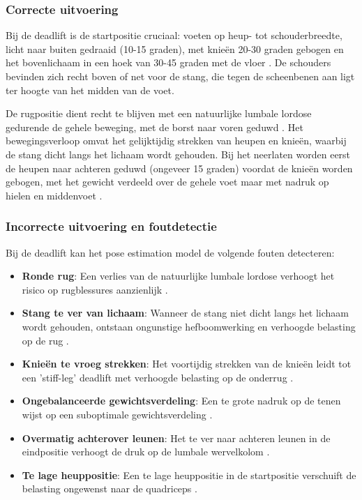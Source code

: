 \subsubsection{Correcte uitvoering}
Bij de deadlift is de startpositie cruciaal: voeten op heup- tot schouderbreedte, licht naar buiten gedraaid (10-15 graden), met knieën 20-30 graden gebogen en het bovenlichaam in een hoek van 30-45 graden met de vloer \autocite{BirdEtAl2010}. 
De schouders bevinden zich recht boven of net voor de stang, die tegen de scheenbenen aan ligt ter hoogte van het midden van de voet.

De rugpositie dient recht te blijven met een natuurlijke lumbale lordose gedurende de gehele beweging, met de borst naar voren geduwd \autocite{Ronai2020}. 
Het bewegingsverloop omvat het gelijktijdig strekken van heupen en knieën, waarbij de stang dicht langs het lichaam wordt gehouden. 
Bij het neerlaten worden eerst de heupen naar achteren geduwd (ongeveer 15 graden) voordat de knieën worden gebogen, met het gewicht verdeeld over de gehele voet maar met nadruk op hielen en middenvoet \autocite{Ronai2020}.

\subsubsection{Incorrecte uitvoering en foutdetectie}
Bij de deadlift kan het pose estimation model de volgende fouten detecteren:

\begin{itemize}
    \item \textbf{Ronde rug}: Een verlies van de natuurlijke lumbale lordose verhoogt het risico op rugblessures aanzienlijk \autocite{BengtssonEtAl2018}. 
    
    \item \textbf{Stang te ver van lichaam}: Wanneer de stang niet dicht langs het lichaam wordt gehouden, ontstaan ongunstige hefboomwerking en verhoogde belasting op de rug \autocite{BengtssonEtAl2018}. 
    
    \item \textbf{Knieën te vroeg strekken}: Het voortijdig strekken van de knieën leidt tot een 'stiff-leg' deadlift met verhoogde belasting op de onderrug \autocite{BengtssonEtAl2018}. 
    
    \item \textbf{Ongebalanceerde gewichtsverdeling}: Een te grote nadruk op de tenen wijst op een suboptimale gewichtsverdeling \autocite{Ronai2020}. 
    
    \item \textbf{Overmatig achterover leunen}: Het te ver naar achteren leunen in de eindpositie verhoogt de druk op de lumbale wervelkolom \autocite{Ronai2020}. 
    
    \item \textbf{Te lage heuppositie}: Een te lage heuppositie in de startpositie verschuift de belasting ongewenst naar de quadriceps \autocite{BirdEtAl2010}. 
\end{itemize}


